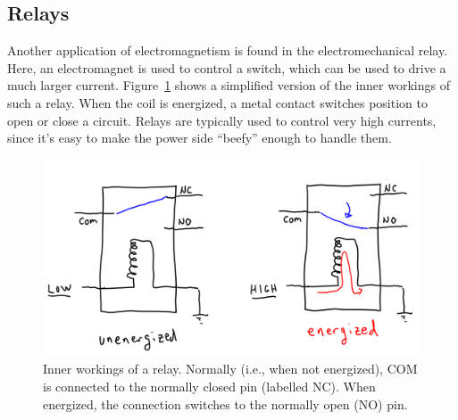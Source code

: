 \documentclass[11pt]{article} %
\begin{document}
\subsection*{Relays}

Another application of electromagnetism is found in the electromechanical relay. Here, an electromagnet is used to control a switch, which can be used to drive a much larger current. Figure~\ref{fig:relay.mech} shows a simplified version of the inner workings of such a relay. When the coil is energized, a metal contact switches position to open or close a circuit. Relays are typically used to control very high currents, since it’s easy to make the power side “beefy” enough to handle them.

\begin{figure}
\centering
\includegraphics[width=4.5in ]{figures/relay_mech.png}
\caption{Inner workings of a relay. Normally (i.e., when not energized), COM is connected to the normally closed pin (labelled NC). When energized, the connection switches to the normally open (NO) pin.}
\label{fig:relay.mech}
\end{figure}
\end{document}

